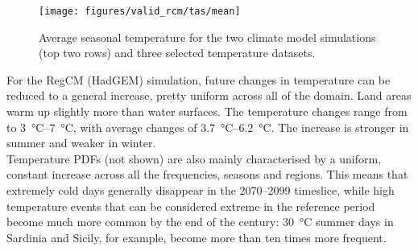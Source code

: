 \begin{figure}
    \centering
    \texttt{[image: figures/valid\_rcm/tas/mean]}
    \decoRule
    \caption[Validation of average seasonal temperature]{
        Average seasonal temperature for the two climate model simulations (top two rows) and three selected temperature datasets.
    } \label{fig:valid_rcm_tas_mean}
\end{figure}


For the RegCM (HadGEM) simulation, future changes in temperature can be reduced to a general increase, pretty uniform across all of the domain.
Land areas warm up slightly more than water surfaces.
The temperature changes range from to \SIrange{3}{7}{\celsius}, with average changes of \SIrange{3.7}{6.2}{\celsius}.
The increase is stronger in summer and weaker in winter.\\
Temperature PDFs (not shown) are also mainly characterised by a uniform, constant increase across all the frequencies, seasons and regions.
This means that extremely cold days generally disappear in the 2070--2099 timeslice, while high temperature events that can be considered extreme in the reference period become much more common by the end of the century: \SI{30}{\celsius} summer days in Sardinia and Sicily, for example, become more than ten times more frequent.

